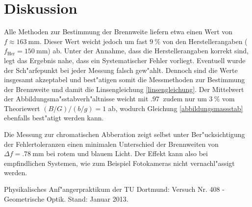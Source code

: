 \clearpage
\section{Diskussion}
	\label{sec:diskussion}
	Alle Methoden zur Bestimmung der Brennweite liefern etwa einen Wert von $f \approx \SI{163}{\milli \meter}$. Dieser Wert weicht jedoch um fast $\SI{9}{\percent}$ von den Herstellerangaben ($f_\mathrm{Her} = \SI{150}{\milli \meter}$) ab.
	Unter der Annahme, dass die Herstellerangaben korrekt sind, legt das Ergebnis nahe, dass ein Systematischer Fehler vorliegt.
	Eventuell wurde der Sch"arfepunkt bei jeder Messung falsch gew"ahlt.
	Dennoch sind die Werte insgesamt akzeptabel und best"atigen somit die Messmethoden zur Bestimmung der Brennweite und damit die Linsengleichung \eqref{linsengleichung}.
	Der Mittelwert der Abbildungsma"sstabverh"altnisse weicht mit $\SI{.97}{}$ zudem nur um $\SI{3}{\percent}$ vom Theoriewert $(B/G)/(b/g) = 1$ ab, wodurch Gleichung \eqref{abbildungsmassstab} ebenfalls best"atigt werden kann.

	Die Messung zur chromatischen Abberation zeigt selbst unter Ber"ucksichtigung der Fehlertoleranzen einen minimalen Unterschied der Brennweiten von $\Delta f = \SI{.78}{\milli \meter}$ bei rotem und blauem Licht.
	Der Effekt kann also bei empfindlichen Systemen, wie zum Beispiel Fotokameras nicht vernachl"assigt werden.

	\begin{thebibliography}{9}
	\label{sec:literaturverzeichnis}
		 Physikalisches Anf"angerpraktikum der TU Dortmund: Versuch Nr. 408 - Geometrische Optik. Stand: Januar 2013.
	\end{thebibliography}
